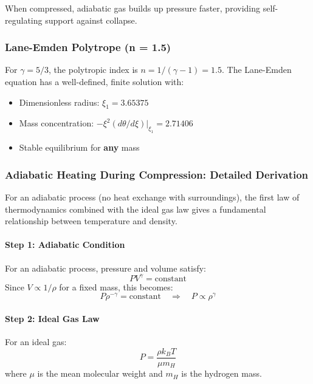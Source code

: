 \documentclass[11pt,a4paper]{article}
\begin{document}
When compressed, adiabatic gas builds up pressure faster, providing self-regulating
support against collapse.

\subsubsection{Lane-Emden Polytrope (n = 1.5)}

For $\gamma = 5/3$, the polytropic index is $n = 1/(\gamma - 1) = 1.5$.
The Lane-Emden equation has a well-defined, finite solution with:
\begin{itemize}
    \item Dimensionless radius: $\xi_1 = 3.65375$
    \item Mass concentration: $-\xi^2 (d\theta/d\xi)|_{\xi_1} = 2.71406$
    \item Stable equilibrium for \textbf{any} mass
\end{itemize}

\subsubsection{Adiabatic Heating During Compression: Detailed Derivation}

For an adiabatic process (no heat exchange with surroundings), the first law of
thermodynamics combined with the ideal gas law gives a fundamental relationship
between temperature and density.

\paragraph{Step 1: Adiabatic Condition}
For an adiabatic process, pressure and volume satisfy:
\begin{equation}
    P V^\gamma = \text{constant}
\end{equation}
Since $V \propto 1/\rho$ for a fixed mass, this becomes:
\begin{equation}
    P \rho^{-\gamma} = \text{constant} \quad \Rightarrow \quad P \propto \rho^\gamma
\end{equation}

\paragraph{Step 2: Ideal Gas Law}
For an ideal gas:
\begin{equation}
    P = \frac{\rho k_B T}{\mu m_H}
\end{equation}
where $\mu$ is the mean molecular weight and $m_H$ is the hydrogen mass.
\end{document}
